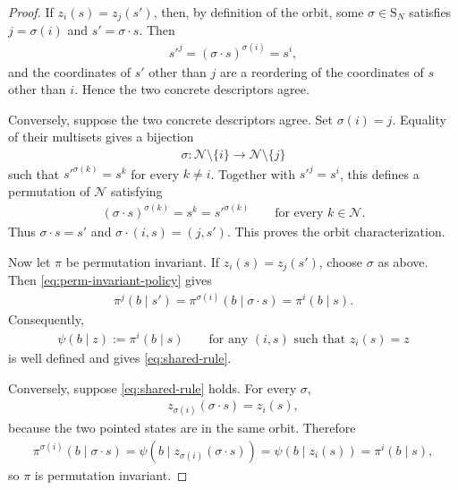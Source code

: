 \documentclass{article}
\theoremstyle{plain}
\theoremstyle{definition}
\theoremstyle{remark}
\newcommand{\N}{\mathcal{N}}
\newcommand{\Sym}{\mathrm{S}}
\begin{document}
\begin{proof}
If $z_i(s)=z_j(s')$, then, by definition of the orbit, some
$\sigma\in\Sym_N$ satisfies $j=\sigma(i)$ and
$s'=\sigma\mathbin{\cdot}s$. Then
\begin{align*}
  s'^j
  =
  (\sigma\mathbin{\cdot}s)^{\sigma(i)}
  =
  s^i,
\end{align*}
and the coordinates of $s'$ other than $j$ are a reordering of the coordinates
of $s$ other than $i$. Hence the two concrete descriptors agree.

Conversely, suppose the two concrete descriptors agree. Set $\sigma(i)=j$.
Equality of their multisets gives a bijection
\begin{align*}
  \sigma:
  \N\setminus\{i\}
  \longrightarrow
  \N\setminus\{j\}
\end{align*}
such that $s'^{\sigma(k)}=s^k$ for every $k\ne i$. Together with
$s'^j=s^i$, this defines a permutation of $\N$ satisfying
\begin{align*}
  (\sigma\mathbin{\cdot}s)^{\sigma(k)}
  =
  s^k
  =
  s'^{\sigma(k)}
  \qquad
  \text{for every $k\in\N$.}
\end{align*}
Thus $\sigma\mathbin{\cdot}s=s'$ and
$\sigma\mathbin{\cdot}(i,s)=(j,s')$. This proves the orbit characterization.

Now let $\pi$ be permutation invariant. If
$z_i(s)=z_j(s')$, choose $\sigma$ as above. Then
\eqref{eq:perm-invariant-policy} gives
\begin{align*}
  \pi^j(b\mid s')
  =
  \pi^{\sigma(i)}(b\mid\sigma\mathbin{\cdot}s)
  =
  \pi^i(b\mid s).
\end{align*}
Consequently,
\begin{align*}
  \psi(b\mid z)
  :=
  \pi^i(b\mid s)
  \qquad
  \text{for any $(i,s)$ such that $z_i(s)=z$}
\end{align*}
is well defined and gives \eqref{eq:shared-rule}.

Conversely, suppose \eqref{eq:shared-rule} holds. For every $\sigma$,
\begin{align*}
  z_{\sigma(i)}(\sigma\mathbin{\cdot}s)
  =
  z_i(s),
\end{align*}
because the two pointed states are in the same orbit. Therefore
\begin{align*}
  \pi^{\sigma(i)}(b\mid\sigma\mathbin{\cdot}s)
  =
  \psi\!\left(
    b\mid z_{\sigma(i)}(\sigma\mathbin{\cdot}s)
  \right)
  =
  \psi(b\mid z_i(s))
  =
  \pi^i(b\mid s),
\end{align*}
so $\pi$ is permutation invariant.


\end{proof}
\end{document}
